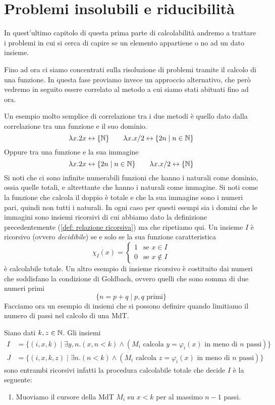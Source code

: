 \chapter{Problemi insolubili e riducibilità}
In quest'ultimo capitolo di questa prima parte di calcolabilità
andremo a trattare i problemi in cui si cerca di capire se un
elemento appartiene o no ad un dato insieme.

Fino ad ora ci siamo concentrati sulla risoluzione di problemi
tramite il calcolo di una funzione. In questa fase proviamo
invece un approccio alternativo, che però vedremo in seguito
essere correlato al metodo a cui siamo stati abituati fino ad
ora.

Un esempio molto semplice di correlazione tra i due metodi è
quello dato dalla correlazione tra una funzione e il suo dominio.
\[
	\lambda x . 2 x \leftrightarrow \{ \mathbb{N} \} \qquad
	\lambda x . x / 2 \leftrightarrow \{ 2n \mid n \in \mathbb{N} \}
\]
Oppure tra una funzione e la sua immagine
\[
	\lambda x . 2 x \leftrightarrow \{ 2 n \mid n \in \mathbb{N} \}
	\qquad \lambda x . x / 2 \leftrightarrow \{ \mathbb{N} \}
\]
Si noti che ci sono infinite numerabili funzioni che hanno i
naturali come dominio, ossia quelle totali, e altrettante che
hanno i naturali come immagine. Si noti come la funzione che
calcola il doppio è totale e che la sua immagine sono i numeri
pari, quindi non tutti i naturali. In ogni caso per questi
esempi sia i domini che le immagini sono insiemi ricorsivi
di cui abbiamo dato la definizione precedentemente
(\ref{def: relazione ricorsiva}) ma che ripetiamo qui. Un
insieme $I$ è ricorsivo (ovvero \emph{decidibile}) se e solo se
la sua funzione caratteristica
\[
	\chi_I (x) = \begin{cases}
		1 & \text{se } x \in I    \\
		0 & \text{se } x \notin I
	\end{cases}
\]
è calcolabile totale. Un altro esempio di insieme ricorsivo è
costituito dai numeri che soddisfano la condizione di Goldbach,
ovvero quelli che sono somma di due numeri primi
\[ \{ n = p + q \mid p, q \text{ primi} \} \]
Facciamo ora un esempio di insiemi che si possono definire
quando limitiamo il numero di passi nel calcolo di una MdT.

\begin{example}
	Siano dati $k, z \in \mathbb{N}$. Gli insiemi
	\begin{align*}
		I & = \{ (i, x, k) \mid \exists y, n . (x,n < k)
		\land (M_i \text{ calcola } y = \varphi_i (x)
		\text{ in meno di } n \text{ passi}) \}          \\
		J & = \{ (i,x,k,z) \mid \exists n . (n < k)
		\land (M_i \text{ calcola } z = \varphi_i (x)
		\text{ in meno di } n \text{ passi}) \}
	\end{align*}
	sono entrambi ricorsivi infatti la procedura calcolabile
	totale che decide $I$ è la seguente:
	\begin{enumerate}
		\item Muoviamo il cursore della MdT $M_i$ su $x < k$
		      per al massimo $n-1$ passi.
	\end{enumerate}
\end{example}

